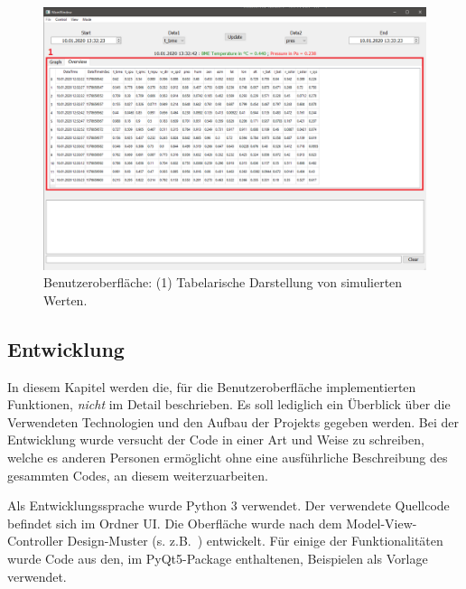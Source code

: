 \begin{figure}[H]
  \centering
  \includegraphics[width=\textwidth]{./img/ui_simulated_table}
  \caption{Benutzeroberfläche: (1) Tabelarische Darstellung von simulierten Werten.}\label{fig:ui_table}
\end{figure}

\subsection{Entwicklung}\label{sec:bo_entwicklung}
In diesem Kapitel werden die, für die Benutzeroberfläche implementierten Funktionen, \emph{nicht} im Detail beschrieben. Es soll lediglich ein Überblick über die Verwendeten Technologien und den Aufbau der Projekts gegeben werden. Bei der Entwicklung wurde versucht der Code in einer Art und Weise zu schreiben, welche es anderen Personen ermöglicht ohne eine ausführliche Beschreibung des gesammten Codes, an diesem weiterzuarbeiten.

Als Entwicklungssprache wurde Python 3 verwendet. Der verwendete Quellcode befindet sich im Ordner \textrm{UI}. Die Oberfläche wurde nach dem Model-View-Controller Design-Muster (s. z.B.~\cite{deacon09}) entwickelt. Für einige der Funktionalitäten wurde Code aus den, im PyQt5-Package enthaltenen, Beispielen als Vorlage verwendet. 


